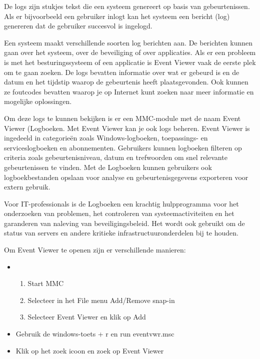 De logs zijn stukjes tekst die een systeem genereert op basis van gebeurtenissen. Als er bijvoorbeeld een gebruiker inlogt kan het systeem een bericht (log) genereren dat de gebruiker succesvol is ingelogd.

Een systeem maakt verschillende soorten log berichten aan. De berichten kunnen gaan over het systeem, over de beveiliging of over applicaties. Als er een probleem is met het besturingssysteem of een applicatie is Event Viewer vaak de eerste plek om te gaan zoeken. De logs bevatten informatie over wat er gebeurd is en de datum en het tijdstip waarop de gebeurtenis heeft plaatsgevonden. Ook kunnen ze foutcodes bevatten waarop je op Internet kunt zoeken naar meer informatie en mogelijke oplossingen.

Om deze logs te kunnen bekijken is er een MMC-module met de naam Event Viewer (Logboeken. Met Event Viewer kan je ook logs beheren. Event Viewer is ingedeeld in categorieën zoals Windows-logboeken, toepassings- en serviceslogboeken en abonnementen. Gebruikers kunnen logboeken filteren op criteria zoals gebeurtenisniveau, datum en trefwoorden om snel relevante gebeurtenissen te vinden. Met de Logboeken kunnen gebruikers ook logboekbestanden opslaan voor analyse en gebeurtenisgegevens exporteren voor extern gebruik.

Voor IT-professionals is de Logboeken een krachtig hulpprogramma voor het onderzoeken van problemen, het controleren van systeemactiviteiten en het garanderen van naleving van beveiligingsbeleid. Het wordt ook gebruikt om de status van servers en andere kritieke infrastructuuronderdelen bij te houden.

Om Event Viewer te openen zijn er verschillende manieren:
\begin{itemize}
\item
	\begin{enumerate}
		\item Start MMC
		\item Selecteer in het File menu Add/Remove snap-in
		\item Selecteer Event Viewer en klik op Add
	\end{enumerate}
\item Gebruik de windows-toets + r en run eventvwr.msc
\item Klik op het zoek icoon en zoek op Event Viewer
\end{itemize}


